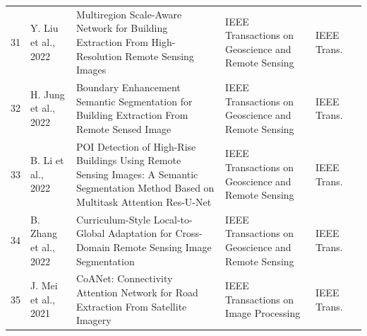 \begin{landscape}
\begin{longtable}{@{}L{0.6cm}L{3.4cm}L{8.2cm}L{5.6cm}L{2.0cm}L{1.2cm}@{}}
31 & Y. Liu et al., 2022 & Multiregion Scale-Aware Network for Building Extraction From High-Resolution Remote Sensing Images & IEEE Transactions on Geoscience and Remote Sensing & IEEE Trans. & \cite{L07} \\
32 & H. Jung et al., 2022 & Boundary Enhancement Semantic Segmentation for Building Extraction From Remote Sensed Image & IEEE Transactions on Geoscience and Remote Sensing & IEEE Trans. & \cite{L08} \\
33 & B. Li et al., 2022 & POI Detection of High-Rise Buildings Using Remote Sensing Images: A Semantic Segmentation Method Based on Multitask Attention Res-U-Net & IEEE Transactions on Geoscience and Remote Sensing & IEEE Trans. & \cite{L09} \\
34 & B. Zhang et al., 2022 & Curriculum-Style Local-to-Global Adaptation for Cross-Domain Remote Sensing Image Segmentation & IEEE Transactions on Geoscience and Remote Sensing & IEEE Trans. & \cite{L44} \\
35 & J. Mei et al., 2021 & CoANet: Connectivity Attention Network for Road Extraction From Satellite Imagery & IEEE Transactions on Image Processing & IEEE Trans. & \cite{L36} \\
\end{longtable}
\end{landscape}
